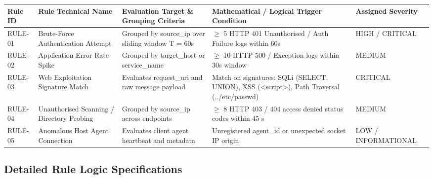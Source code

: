 \begin{table}[htbp]
\centering
\begin{tabular}{|P{3cm}|P{5cm}|P{5cm}|P{5cm}|P{3cm}|}
\hline
Rule ID & Rule Technical Name & Evaluation Target \& Grouping Criteria & Mathematical / Logical Trigger Condition & Assigned Severity \\ \hline
RULE-01 & Brute-Force Authentication Attempt & Grouped by source\_ip over sliding window T = 60s & $\ge$ 5 HTTP 401 Unauthorised / Auth Failure logs within 60s & HIGH / CRITICAL \\ \hline
RULE-02 & Application Error Rate Spike & Grouped by target\_host or service\_name & $\ge$ 10 HTTP 500 / Exception logs within 30s window & MEDIUM \\ \hline
RULE-03 & Web Exploitation Signature Match & Evaluates request\_uri and raw message payload & Match on signatures: SQLi (SELECT, UNION), XSS (<script>), Path Traversal (../etc/passwd) & CRITICAL \\ \hline
RULE-04 & Unauthorised Scanning / Directory Probing & Grouped by source\_ip across endpoints & $\ge$ 8 HTTP 403 / 404 access denied status codes within 45 s & MEDIUM \\ \hline
RULE-05 & Anomalous Host Agent Connection & Evaluates client agent heartbeat and metadata & Unregistered agent\_id or unexpected socket IP origin & LOW / INFORMATIONAL \\ \hline
\end{tabular}
\end{table}

\subsection{Detailed Rule Logic Specifications}

